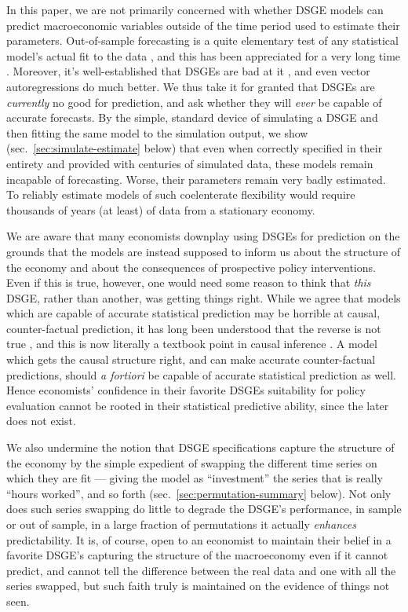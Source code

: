 \documentclass[11pt]{article}
\begin{document}
In this paper, we are not primarily concerned with whether DSGE models
can predict macroeconomic variables outside of the time period used to
estimate their parameters. Out-of-sample forecasting is a quite
elementary test of any statistical model's actual fit to the data
\citep{tEoSL-2nd}, and this has been appreciated for a very long time
\citep{Stone1974,Geisser-predictive-sample-reuse,Geisser-Eddy-predictive-approach}.
Moreover, it's well-established that DSGEs are bad at it
\citep{Edge-Gurkaynak-on-dsges}, and even vector autoregressions do much
better. We thus take it for granted that DSGEs are \emph{currently} no
good for prediction, and ask whether they will \emph{ever} be capable of
accurate forecasts. By the simple, standard device of simulating a DSGE
and then fitting the same model to the simulation output, we show
(sec.~\ref{sec:simulate-estimate} below) that even when correctly
specified in their entirety and provided with centuries of simulated
data, these models remain incapable of forecasting. Worse, their
parameters remain very badly estimated. To reliably estimate models of
such coelenterate flexibility would require thousands of years (at
least) of data from a stationary economy.

We are aware that many economists downplay using DSGEs for prediction on
the grounds that the models are instead supposed to inform us about the
structure of the economy and about the consequences of prospective
policy interventions. Even if this is true, however, one would need some
reason to think that \emph{this} DSGE, rather than another, was getting
things right. While we agree that models which are capable of accurate
statistical prediction may be horrible at causal, counter-factual
prediction, it has long been understood that the reverse is not true
\citep{Spirtes-Glymour-Scheines-1st, Pearl-causality}, and this is now
literally a textbook point in causal inference
\citep{Morgan-Winship-counterfactuals-2nd}. A model which gets the
causal structure right, and can make accurate counter-factual
predictions, should \emph{a fortiori} be capable of accurate statistical
prediction as well. Hence economists' confidence in their favorite DSGEs
suitability for policy evaluation cannot be rooted in their statistical
predictive ability, since the later does not exist.

We also undermine the notion that DSGE specifications capture the
structure of the economy by the simple expedient of swapping the
different time series on which they are fit --- giving the model as
``investment'' the series that is really ``hours worked'', and so forth
(sec.~\ref{sec:permutation-summary} below). Not only does such series
swapping do little to degrade the DSGE's performance, in sample or out
of sample, in a large fraction of permutations it actually
\emph{enhances} predictability. It is, of course, open to an economist
to maintain their belief in a favorite DSGE's capturing the structure of
the macroeconomy even if it cannot predict, and cannot tell the
difference between the real data and one with all the series swapped,
but such faith truly is maintained on the evidence of things not seen.
\end{document}
